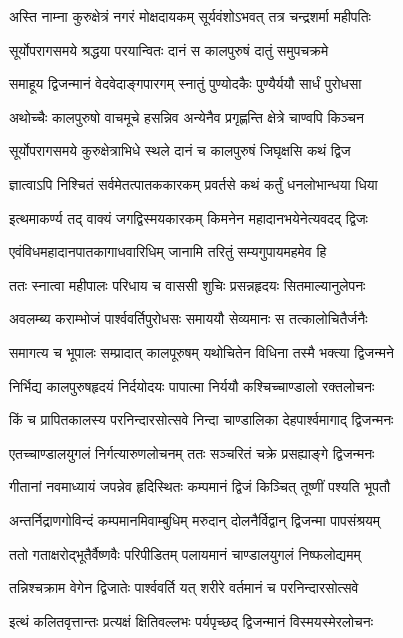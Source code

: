 \twolineshloka
{अस्ति नाम्ना कुरुक्षेत्रं नगरं मोक्षदायकम्}
{सूर्यवंशोऽभवत् तत्र चन्द्रशर्मा महीपतिः} %

\twolineshloka
{सूर्योपरागसमये श्रद्धया परयान्वितः}
{दानं स कालपुरुषं दातुं समुपचक्रमे} %

\twolineshloka
{समाहूय द्विजन्मानं वेदवेदाङ्गपारगम्}
{स्नातुं पुण्योदकैः पुण्यैर्ययौ सार्धं पुरोधसा} %

\twolineshloka
{अथोच्चैः कालपुरुषो वाचमूचे हसन्निव}
{अन्येनैव प्रगृह्णन्ति क्षेत्रे चाण्वपि किञ्चन} %

\twolineshloka
{सूर्योपरागसमये कुरुक्षेत्राभिधे स्थले}
{दानं च कालपुरुषं जिघृक्षसि कथं द्विज} %

\twolineshloka
{ज्ञात्वाऽपि निश्चितं सर्वमेतत्पातककारकम्}
{प्रवर्तसे कथं कर्तुं धनलोभान्धया धिया} %

\twolineshloka
{इत्थमाकर्ण्य तद् वाक्यं जगद्विस्मयकारकम्}
{किमनेन महादानभयेनेत्यवदद् द्विजः} %

\twolineshloka
{एवंविधमहादानपातकागाधवारिधिम्}
{जानामि तरितुं सम्यगुपायमहमेव हि} %

\twolineshloka
{ततः स्नात्वा महीपालः परिधाय च वाससी}
{शुचिः प्रसन्नहृदयः सितमाल्यानुलेपनः} %

\twolineshloka
{अवलम्ब्य कराम्भोजं पार्श्ववर्तिपुरोधसः}
{समाययौ सेव्यमानः स तत्कालोचितैर्जनैः} %

\twolineshloka
{समागत्य च भूपालः सम्प्रादात् कालपूरुषम्}
{यथोचितेन विधिना तस्मै भक्त्या द्विजन्मने} %

\twolineshloka
{निर्भिद्य कालपुरुषहृदयं निर्दयोदयः}
{पापात्मा निर्ययौ कश्चिच्चाण्डालो रक्तलोचनः} %

\twolineshloka
{किं च प्रापितकालस्य परनिन्दारसोत्सवे}
{निन्दा चाण्डालिका देहपार्श्वमागाद् द्विजन्मनः} %

\twolineshloka
{एतच्चाण्डालयुगलं निर्गत्यारुणलोचनम्}
{ततः सञ्चरितं चक्रे प्रसह्याङ्गे द्विजन्मनः} %

\twolineshloka
{गीतानां नवमाध्यायं जपन्नेव हृदिस्थितः}
{कम्पमानं द्विजं किञ्चित् तूष्णीं पश्यति भूपतौ} %

\twolineshloka
{अन्तर्निद्राणगोविन्दं कम्पमानमिवाम्बुधिम्}
{मरुदान् दोलनैर्विद्वान् द्विजन्मा पापसंश्रयम्} %

\twolineshloka
{ततो गताक्षरोद्भूतैर्वैष्णवैः परिपीडितम्}
{पलायमानं चाण्डालयुगलं निष्फलोद्यमम्} %

\twolineshloka
{तन्निश्चक्राम वेगेन द्विजातेः पार्श्ववर्ति यत्}
{शरीरे वर्तमानं च परनिन्दारसोत्सवे} %

\twolineshloka
{इत्थं कलितवृत्तान्तः प्रत्यक्षं क्षितिवल्लभः}
{पर्यपृच्छद् द्विजन्मानं विस्मयस्मेरलोचनः} %

